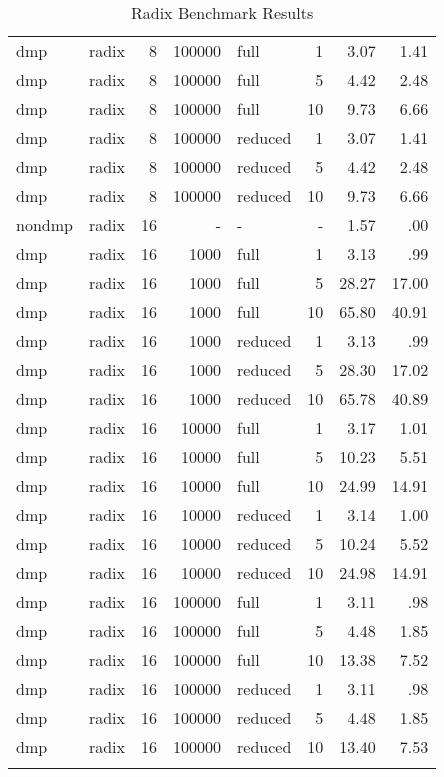 \begin{center}
\begin{small}
\begin{longtable}{llrrlrrr}
dmp & radix & 8 & 100000 & full & 1 & 3.07 & 1.41\\
dmp & radix & 8 & 100000 & full & 5 & 4.42 & 2.48\\
dmp & radix & 8 & 100000 & full & 10 & 9.73 & 6.66\\
dmp & radix & 8 & 100000 & reduced & 1 & 3.07 & 1.41\\
dmp & radix & 8 & 100000 & reduced & 5 & 4.42 & 2.48\\
dmp & radix & 8 & 100000 & reduced & 10 & 9.73 & 6.66\\
\hline
nondmp & radix & 16 & - & - & - & 1.57 & .00\\
dmp & radix & 16 & 1000 & full & 1 & 3.13 & .99\\
dmp & radix & 16 & 1000 & full & 5 & 28.27 & 17.00\\
dmp & radix & 16 & 1000 & full & 10 & 65.80 & 40.91\\
dmp & radix & 16 & 1000 & reduced & 1 & 3.13 & .99\\
dmp & radix & 16 & 1000 & reduced & 5 & 28.30 & 17.02\\
dmp & radix & 16 & 1000 & reduced & 10 & 65.78 & 40.89\\
dmp & radix & 16 & 10000 & full & 1 & 3.17 & 1.01\\
dmp & radix & 16 & 10000 & full & 5 & 10.23 & 5.51\\
dmp & radix & 16 & 10000 & full & 10 & 24.99 & 14.91\\
dmp & radix & 16 & 10000 & reduced & 1 & 3.14 & 1.00\\
dmp & radix & 16 & 10000 & reduced & 5 & 10.24 & 5.52\\
dmp & radix & 16 & 10000 & reduced & 10 & 24.98 & 14.91\\
dmp & radix & 16 & 100000 & full & 1 & 3.11 & .98\\
dmp & radix & 16 & 100000 & full & 5 & 4.48 & 1.85\\
dmp & radix & 16 & 100000 & full & 10 & 13.38 & 7.52\\
dmp & radix & 16 & 100000 & reduced & 1 & 3.11 & .98\\
dmp & radix & 16 & 100000 & reduced & 5 & 4.48 & 1.85\\
dmp & radix & 16 & 100000 & reduced & 10 & 13.40 & 7.53\\
\hline
\caption{Radix Benchmark Results}
\label{tab:radix_results}
\end{longtable}
\end{small}
\end{center}

